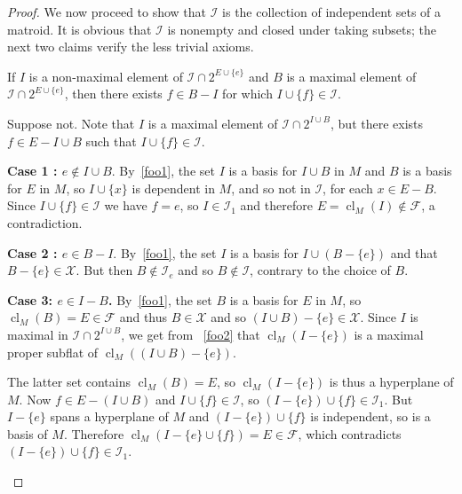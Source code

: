 \documentclass[10pt,a4paper]{amsart}
\newcommand{\cF}{\mathcal{F}}
\newcommand{\cI}{\mathcal{I}}
\newcommand{\cX}{\mathcal{X}}
\DeclareMathOperator{\cl}{cl}
\begin{document}
\begin{proof}
  We now proceed to show that $\cI$ is the collection of independent sets of a matroid. 
  It is obvious that $\cI$ is nonempty and closed under taking subsets; 
  the next two claims verify the less trivial axioms. 

  \begin{claim}
    If $I$ is a non-maximal element of $\cI \cap 2^{E \cup \{e\}}$ and $B$ is a maximal element of 
    $\cI \cap 2^{E \cup \{e\}}$, then there exists $f \in B - I$ for which $I \cup \{f\} \in \cI$. 
  \end{claim}
  \begin{subproof}
    
    Suppose not. Note that $I$ is a maximal element of $\cI \cap 2^{I \cup B}$, 
    but there exists $f \in E - I \cup B$ such that $I \cup \{f\} \in \cI$. 

    
    \textbf{Case 1 : $e \notin I \cup B$}. By~\ref{foo1}, the set $I$ is a basis for $I \cup B$ in $M$
    and $B$ is a basis for $E$ in $M$, so $I \cup \{x\}$ is dependent in $M$, and so not in $\cI$,
    for each $x \in E-B$. Since $I \cup \{f\} \in \cI$ we have $f = e$, so $I \in \cI_1$ 
    and therefore $E = \cl_M(I) \notin \cF$, a contradiction. 

    \textbf{Case 2 : $e \in B - I$}. 
    By~\ref{foo1}, 
    the set $I$ is a basis for $I \cup (B - \{e\})$ and that $B - \{e\} \in \cX$. 
    But then $B \notin \cI_e$ and so $B \notin \cI$, contrary to the choice of $B$. 

    \textbf{Case 3: $e \in I - B$.}
    By~\ref{foo1}, the set $B$ is a basis for $E$ in $M$, so $\cl_M(B) = E \in \cF$ and thus $B \in \cX$ and so $(I \cup B) - \{e\} \in \cX$. Since $I$ is maximal in $\cI \cap 2^{I \cup B}$, 
    we get from ~\ref{foo2} that $\cl_M(I - \{e\})$ is a maximal proper subflat of $\cl_M((I \cup B)- \{e\})$. 
    
    The latter set contains $\cl_M(B) = E$, so $\cl_M(I - \{e\})$ is thus a hyperplane of $M$.
    Now $f \in E - (I \cup B)$ and $I \cup \{f\} \in \cI$, so $(I - \{e\}) \cup \{f\} \in \cI_1$. 
    But $I - \{e\}$ spans a hyperplane of $M$ and $(I - \{e\}) \cup \{f\}$ is independent, 
    so is a basis of $M$. Therefore $\cl_M(I - \{e\} \cup \{f\}) = E \in \cF$, 
    which contradicts $(I - \{e\}) \cup \{f\} \in \cI_1$. 


\end{subproof}
\end{proof}
\end{document}
